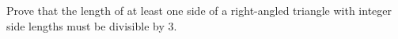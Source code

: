 





\question Prove that the length of at least one side of a right-angled triangle with integer side lengths must be divisible by 3.

